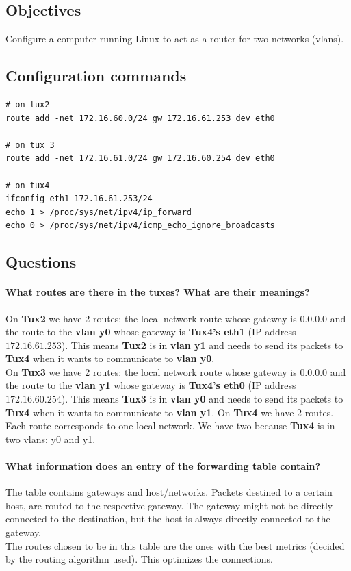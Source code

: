 \documentclass[11pt]{report}
\newcommand{\tux}[1]{\textbf{Tux#1}}
\begin{document}
\subsection{Objectives}
Configure a computer running Linux to act as a router for two networks (vlans).

\subsection{Configuration commands}
\begin{lstlisting}
# on tux2
route add -net 172.16.60.0/24 gw 172.16.61.253 dev eth0

# on tux 3
route add -net 172.16.61.0/24 gw 172.16.60.254 dev eth0

# on tux4
ifconfig eth1 172.16.61.253/24
echo 1 > /proc/sys/net/ipv4/ip_forward
echo 0 > /proc/sys/net/ipv4/icmp_echo_ignore_broadcasts
\end{lstlisting}

\subsection{Questions}
\paragraph{What routes are there in the tuxes? What are their meanings?}
On \tux{2} we have 2 routes: the local network route whose gateway is
$0.0.0.0$ and the route to the \textbf{vlan y0} whose gateway is
\textbf{Tux4's eth1} (IP address $172.16.61.253$). This means \tux{2}
is in \textbf{vlan y1} and needs to send its packets to \tux{4}
when it wants to communicate to \textbf{vlan y0}.\\
On \tux{3} we have 2 routes: the local network route whose gateway is
$0.0.0.0$ and the route to the \textbf{vlan y1} whose gateway is
\textbf{Tux4's eth0} (IP address $172.16.60.254$). This means \tux{3}
is in \textbf{vlan y0} and needs to send its packets to \tux{4}
when it wants to communicate to \textbf{vlan y1}.
On \tux{4} we have 2 routes. Each route corresponds to one local network.
We have two because \tux{4} is in two vlans: y0 and y1.

\paragraph{What information does an entry of the forwarding table contain?}
The table contains gateways and host/networks. Packets destined to a certain host,
are routed to the respective gateway. The gateway might not be directly connected
to the destination, but the host is always directly connected to the gateway.\\
The routes chosen to be in this table are the ones with the best metrics (decided
by the routing algorithm used). This optimizes the connections.
\end{document}
